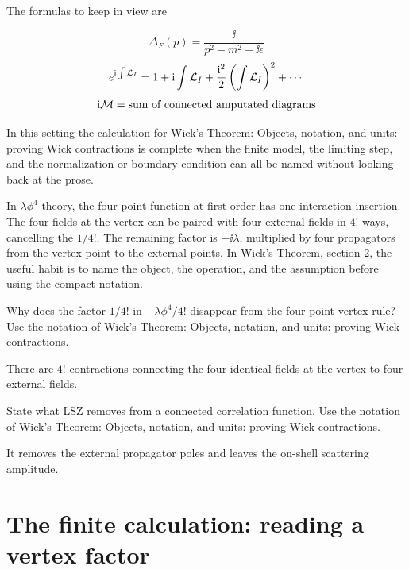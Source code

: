The formulas to keep in view are

\[
  \Delta_F(p)=\frac{\ii}{p^2-m^2+\ii\epsilon}
\]
\[
  e^{\mathrm i\int\mathcal L_I}=1+\mathrm i\int\mathcal L_I+\frac{\mathrm i^2}{2}\left(\int\mathcal L_I\right)^2+\cdots
\]
\[
  \mathrm i\mathcal M=\hbox{sum of connected amputated diagrams}
\]

In this setting the calculation for Wick's Theorem: Objects, notation, and units: proving Wick contractions is complete when the finite model, the limiting step, and the normalization or boundary condition can all be named without looking back at the prose.




\begin{example}
In \(\lambda\phi^4\) theory, the four-point function at first order has one interaction insertion.  The four fields at the vertex can be paired with four external fields in \(4!\) ways, cancelling the \(1/4!\).  The remaining factor is \(-\ii\lambda\), multiplied by four propagators from the vertex point to the external points.  In Wick's Theorem, section 2, the useful habit is to name the object, the operation, and the assumption before using the compact notation.
\end{example}



\begin{exercise}
Why does the factor \(1/4!\) in \(-\lambda\phi^4/4!\) disappear from the four-point vertex rule?  Use the notation of Wick's Theorem: Objects, notation, and units: proving Wick contractions.
\begin{answer}
There are \(4!\) contractions connecting the four identical fields at the vertex to four external fields.
\end{answer}
\end{exercise}

\begin{exercise}
State what LSZ removes from a connected correlation function.  Use the notation of Wick's Theorem: Objects, notation, and units: proving Wick contractions.
\begin{answer}
It removes the external propagator poles and leaves the on-shell scattering amplitude.
\end{answer}
\end{exercise}



\section{The finite calculation: reading a vertex factor}

